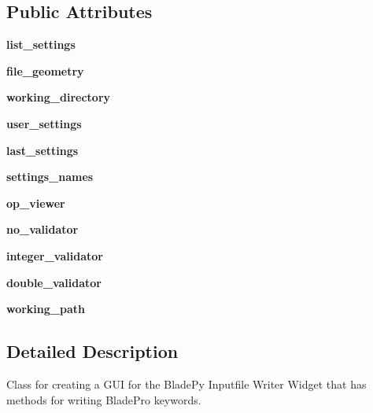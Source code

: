 \subsection*{Public Attributes}
\begin{DoxyCompactItemize}
\item 
\hypertarget{a00073_ad019b7f076cb8b8b6820b6577d2058b6}{}\label{a00073_ad019b7f076cb8b8b6820b6577d2058b6} 
{\bfseries list\+\_\+settings}
\item 
\hypertarget{a00073_a17d54af05f4344118b082c2384a88bec}{}\label{a00073_a17d54af05f4344118b082c2384a88bec} 
{\bfseries file\+\_\+geometry}
\item 
\hypertarget{a00073_a267e018648a6f03f2bcc0a5b7c944f38}{}\label{a00073_a267e018648a6f03f2bcc0a5b7c944f38} 
{\bfseries working\+\_\+directory}
\item 
\hypertarget{a00073_a4f8dfa192201c6c945621ff197680200}{}\label{a00073_a4f8dfa192201c6c945621ff197680200} 
{\bfseries user\+\_\+settings}
\item 
\hypertarget{a00073_aa8731441bd4fdf801f74947c28d44ebf}{}\label{a00073_aa8731441bd4fdf801f74947c28d44ebf} 
{\bfseries last\+\_\+settings}
\item 
\hypertarget{a00073_a3ce7139eaa5256714413efdb9f870eab}{}\label{a00073_a3ce7139eaa5256714413efdb9f870eab} 
{\bfseries settings\+\_\+names}
\item 
\hypertarget{a00073_af3daf3ca641b77de41d08750af03ef5e}{}\label{a00073_af3daf3ca641b77de41d08750af03ef5e} 
{\bfseries op\+\_\+viewer}
\item 
\hypertarget{a00073_aa6e2504eda6ac2ee99e37d4b5f862f57}{}\label{a00073_aa6e2504eda6ac2ee99e37d4b5f862f57} 
{\bfseries no\+\_\+validator}
\item 
\hypertarget{a00073_a33d2c6ecfa0800ef5eccfe0ce71475ee}{}\label{a00073_a33d2c6ecfa0800ef5eccfe0ce71475ee} 
{\bfseries integer\+\_\+validator}
\item 
\hypertarget{a00073_a007df19a104366a8bb63a8ed11e0e5e4}{}\label{a00073_a007df19a104366a8bb63a8ed11e0e5e4} 
{\bfseries double\+\_\+validator}
\item 
\hypertarget{a00073_a2e8a633f45ef3a17852bc95deae51588}{}\label{a00073_a2e8a633f45ef3a17852bc95deae51588} 
{\bfseries working\+\_\+path}
\end{DoxyCompactItemize}


\subsection{Detailed Description}
Class for creating a G\+UI for the Blade\+Py Inputfile Writer Widget that has methods for writing Blade\+Pro keywords. 

